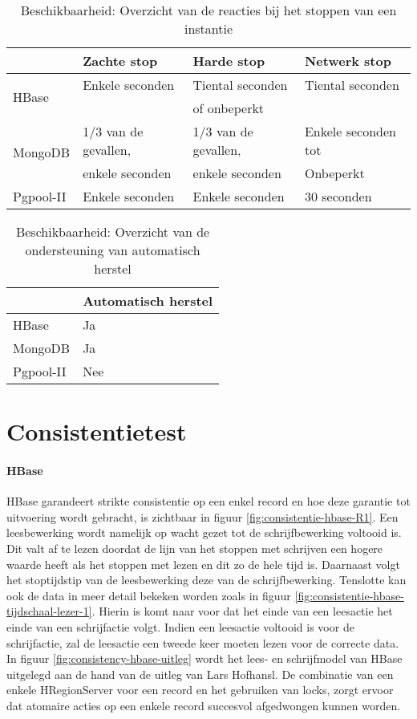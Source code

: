 \begin{table}[htbp]
  \centering
    \begin{tabular}{l | lll}
          & Zachte stop & Harde stop & Netwerk stop \\
    \hline
    \multirow{2}{*}{HBase} & Enkele seconden & Tiental seconden & Tiental seconden \\
    & & of onbeperkt&  \\
    \multirow{2}{*}{MongoDB} & 1/3 van de gevallen, & 1/3 van de gevallen, & Enkele seconden tot \\
    & enkele seconden & enkele seconden & Onbeperkt\\
    Pgpool-II & Enkele seconden & Enkele seconden & 30 seconden \\
    \end{tabular}%
    \caption{Beschikbaarheid: Overzicht van de reacties bij het stoppen van een instantie }
  \label{table:beschikbaarheid-stop-resultaat}%
\end{table}

\begin{table}[htbp]
  \centering
    \begin{tabular}{l|l}
          & Automatisch herstel \\
    \hline
    HBase & Ja \\
    MongoDB & Ja \\
    Pgpool-II & Nee \\
    \end{tabular}%
      \caption{Beschikbaarheid: Overzicht van de ondersteuning van automatisch herstel}
  \label{table:beschikbaarheid-herstel-resultaat}%
\end{table}%



\section{Consistentietest}
\paragraph{HBase} HBase garandeert strikte consistentie op een enkel record en hoe deze garantie tot uitvoering wordt gebracht, is zichtbaar in figuur \ref{fig:consistentie-hbase-R1}. Een leesbewerking wordt namelijk op wacht gezet tot de schrijfbewerking voltooid is. Dit valt af te lezen doordat de lijn van het stoppen met schrijven een hogere waarde heeft als het stoppen met lezen en dit zo de hele tijd is. Daarnaast volgt het stoptijdstip van de leesbewerking deze van de schrijfbewerking. Tenslotte kan ook de data in meer detail bekeken worden zoals in figuur \ref{fig:consistentie-hbase-tijdschaal-lezer-1}. Hierin is komt naar voor dat het einde van een leesactie het einde van een schrijfactie volgt. Indien een leesactie voltooid is voor de schrijfactie, zal de leesactie een tweede keer moeten lezen voor de correcte data. In figuur \ref{fig:consistency-hbase-uitleg} wordt het lees- en schrijfmodel van HBase uitgelegd aan de hand van de uitleg van Lars Hofhansl\cite{hbase-acid}. De combinatie van een enkele HRegionServer voor een record en het gebruiken van locks, zorgt ervoor dat atomaire acties op een enkele record succesvol afgedwongen kunnen worden.     

